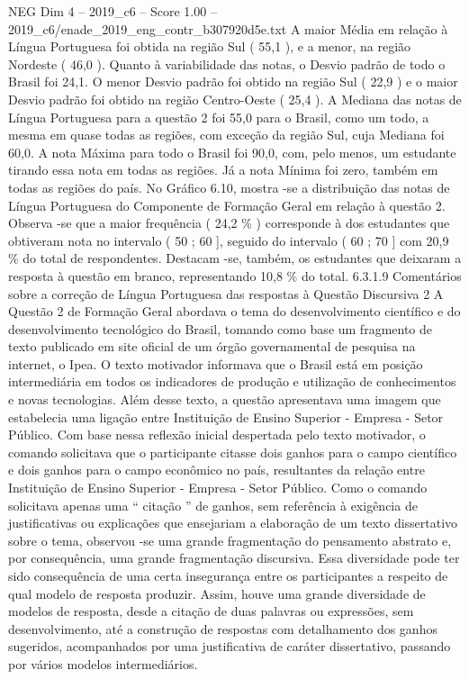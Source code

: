 \begin{textsample}{NEG Dim 4 – 2019\_c6 – Score 1.00 – 2019\_c6/enade\_2019\_eng\_contr\_b307920d5e.txt}
A maior Média em relação à Língua Portuguesa foi obtida na região Sul ( 55,1 ), e a menor, na região Nordeste ( 46,0 ).
Quanto à variabilidade das notas, o Desvio padrão de todo o Brasil foi 24,1.
O menor Desvio padrão foi obtido na região Sul ( 22,9 ) e o maior Desvio padrão foi obtido na região Centro-Oeste ( 25,4 ).
A Mediana das notas de Língua Portuguesa para a questão 2 foi 55,0 para o Brasil, como um todo, a mesma em quase todas as regiões, com exceção da região Sul, cuja Mediana foi 60,0.
A nota Máxima para todo o Brasil foi 90,0, com, pelo menos, um estudante tirando essa nota em todas as regiões.
Já a nota Mínima foi zero, também em todas as regiões do país.
No Gráfico 6.10, mostra -se a distribuição das notas de Língua Portuguesa do Componente de Formação Geral em relação à questão 2.
Observa -se que a maior frequência ( 24,2 \% ) corresponde à dos estudantes que obtiveram nota no intervalo ( 50 ; 60 ], seguido do intervalo ( 60 ; 70 ] com 20,9 \% do total de respondentes.
Destacam -se, também, os estudantes que deixaram a resposta à questão em branco, representando 10,8 \% do total. 6.3.1.9 Comentários sobre a correção de Língua Portuguesa das respostas à Questão Discursiva 2 A Questão 2 de Formação Geral abordava o tema do desenvolvimento científico e do desenvolvimento tecnológico do Brasil, tomando como base um fragmento de texto publicado em site oficial de um órgão governamental de pesquisa na internet, o Ipea.
O texto motivador informava que o Brasil está em posição intermediária em todos os indicadores de produção e utilização de conhecimentos e novas tecnologias.
Além desse texto, a questão apresentava uma imagem que estabelecia uma ligação entre Instituição de Ensino Superior - Empresa - Setor Público.
Com base nessa reflexão inicial despertada pelo texto motivador, o comando solicitava que o participante citasse dois ganhos para o campo científico e dois ganhos para o campo econômico no país, resultantes da relação entre Instituição de Ensino Superior - Empresa - Setor Público.
Como o comando solicitava apenas uma “ citação ” de ganhos, sem referência à exigência de justificativas ou explicações que ensejariam a elaboração de um texto dissertativo sobre o tema, observou -se uma grande fragmentação do pensamento abstrato e, por consequência, uma grande fragmentação discursiva.
Essa diversidade pode ter sido consequência de uma certa insegurança entre os participantes a respeito de qual modelo de resposta produzir.
Assim, houve uma grande diversidade de modelos de resposta, desde a citação de duas palavras ou expressões, sem desenvolvimento, até a construção de respostas com detalhamento dos ganhos sugeridos, acompanhados por uma justificativa de caráter dissertativo, passando por vários modelos intermediários.

\end{textsample}
